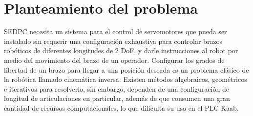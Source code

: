\section{Planteamiento del problema}

SEDPC necesita un sistema para el control de servomotores que pueda ser instalado sin requerir una configuración exhaustiva para controlar brazos robóticos de diferentes longitudes de 2 DoF, y darle instrucciones al robot por medio del movimiento del brazo de un operador.
\newline\newline\newline
Configurar los grados de libertad de un brazo para llegar a una posición deseada es un problema clásico de la robótica llamado cinemática inversa. Existen métodos algebraicos, geométricos e iterativos para resolverlo, sin embargo, dependen de una configuración de longitud de articulaciones en particular, además de que consumen una gran cantidad de recursos computacionales, lo que dificulta su uso en el PLC Kaab.